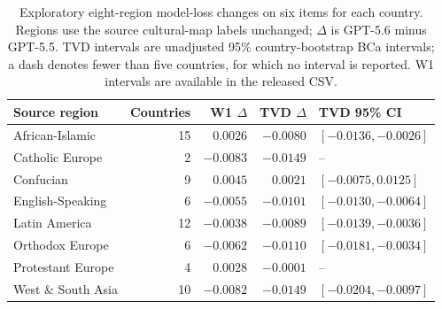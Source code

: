 \begin{table}[!htbp]
\centering
\caption{Exploratory eight-region model-loss changes on six items for each
country. Regions use the source cultural-map labels unchanged; $\Delta$ is
GPT-5.6 minus GPT-5.5. TVD intervals are unadjusted 95\% country-bootstrap
BCa intervals; a dash denotes fewer than five countries, for which no
interval is reported. W1 intervals are available in the released CSV.}
\label{tab:eight-regions}
\scriptsize
\setlength{\tabcolsep}{3pt}
\begin{tabular}{l r r r p{.25\linewidth}}
\toprule
\rowcolor{tablehead}
Source region & Countries & W1 $\Delta$ & TVD $\Delta$ & TVD 95\% CI \\
\midrule
African-Islamic & 15 & $0.0026$ & $-0.0080$ & $[-0.0136,-0.0026]$ \\
Catholic Europe & 2 & $-0.0083$ & $-0.0149$ & -- \\
Confucian & 9 & $0.0045$ & $0.0021$ & $[-0.0075,0.0125]$ \\
English-Speaking & 6 & $-0.0055$ & $-0.0101$ & $[-0.0130,-0.0064]$ \\
Latin America & 12 & $-0.0038$ & $-0.0089$ & $[-0.0139,-0.0036]$ \\
Orthodox Europe & 6 & $-0.0062$ & $-0.0110$ & $[-0.0181,-0.0034]$ \\
Protestant Europe & 4 & $0.0028$ & $-0.0001$ & -- \\
West \& South Asia & 10 & $-0.0082$ & $-0.0149$ & $[-0.0204,-0.0097]$ \\
\bottomrule
\end{tabular}
\end{table}
